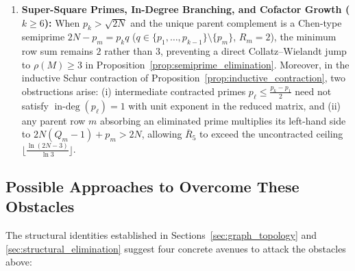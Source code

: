 \documentclass[11pt,a4paper]{article}
\theoremstyle{definition}
\begin{document}
\begin{enumerate}
    \item \textbf{Super-Square Primes, In-Degree Branching, and Cofactor Growth ($k \ge 6$):}  
    When $p_k > \sqrt{2N}$ and the unique parent complement is a Chen-type semiprime $2N - p_m = p_k q$ ($q \in \{p_1, \dots, p_{k-1}\} \setminus \{p_m\}$, $R_m = 2$), the minimum row sum remains $2$ rather than $3$, preventing a direct Collatz--Wielandt jump to $\rho(M) \ge 3$ in Proposition~\ref{prop:semiprime_elimination}. Moreover, in the inductive Schur contraction of Proposition~\ref{prop:inductive_contraction}, two obstructions arise: (i) intermediate contracted primes $p_\ell \le \frac{p_k - p_1}{2}$ need not satisfy $\operatorname{in-deg}(p_\ell) = 1$ with unit exponent in the reduced matrix, and (ii) any parent row $m$ absorbing an eliminated prime multiplies its left-hand side to $2N(Q_m - 1) + p_m > 2N$, allowing $\overline{R}_5$ to exceed the uncontracted ceiling $\lfloor \frac{\ln(2N-3)}{\ln 3} \rfloor$.
\end{enumerate}

\subsection{Possible Approaches to Overcome These Obstacles}
\label{subsec:future_directions}

The structural identities established in Sections~\ref{sec:graph_topology} and \ref{sec:structural_elimination} suggest four concrete avenues to attack the obstacles above:
\end{document}
